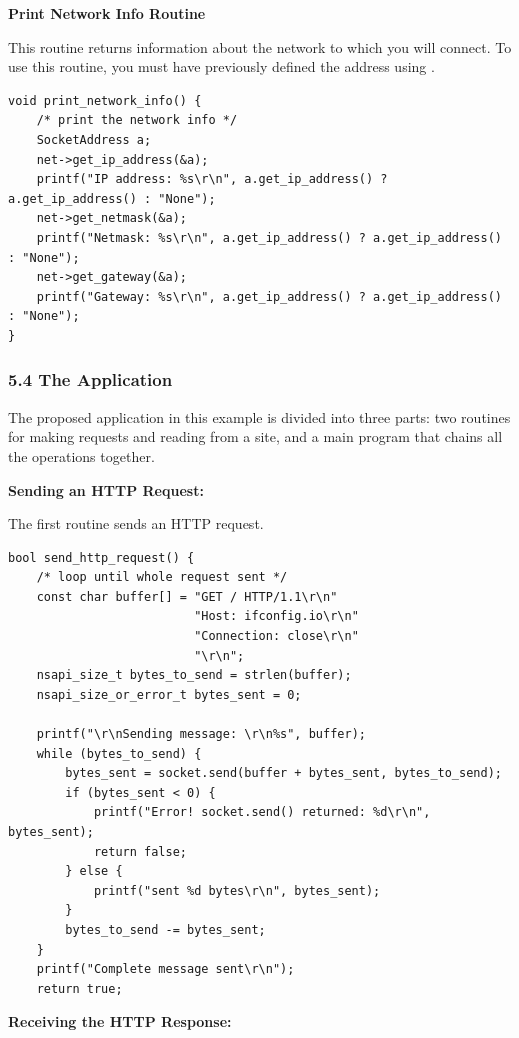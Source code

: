 \documentclass[10pt,a4paper,onecolumn]{article}
\let\textttOrig=\texttt
\def\texttt#1{\expandafter\textttOrig{\seqsplit{#1}}}
\begin{document}
\textbf{Print Network Info Routine}

This routine returns information about the network to which you will connect. To use this routine, you must have previously defined the address using \texttt{resolve\_hostname}.

\begin{lstlisting}[style=CStyle]
void print_network_info() {
    /* print the network info */
    SocketAddress a;
    net->get_ip_address(&a);
    printf("IP address: %s\r\n", a.get_ip_address() ? a.get_ip_address() : "None");
    net->get_netmask(&a);
    printf("Netmask: %s\r\n", a.get_ip_address() ? a.get_ip_address() : "None");
    net->get_gateway(&a);
    printf("Gateway: %s\r\n", a.get_ip_address() ? a.get_ip_address() : "None");
}
\end{lstlisting}

\hypertarget{the-application}{%
\subsubsection{5.4 The Application}\label{the-application}}

The proposed application in this example is divided into three parts:
two routines for making requests and reading from a site, and a main
program that chains all the operations together.

\textbf{Sending an HTTP Request:}

The first routine sends an HTTP request.

\begin{lstlisting}[style=CStyle]
  bool send_http_request() {
    /* loop until whole request sent */
    const char buffer[] = "GET / HTTP/1.1\r\n"
                          "Host: ifconfig.io\r\n"
                          "Connection: close\r\n"
                          "\r\n";
    nsapi_size_t bytes_to_send = strlen(buffer);
    nsapi_size_or_error_t bytes_sent = 0;

    printf("\r\nSending message: \r\n%s", buffer);
    while (bytes_to_send) {
        bytes_sent = socket.send(buffer + bytes_sent, bytes_to_send);
        if (bytes_sent < 0) {
            printf("Error! socket.send() returned: %d\r\n", bytes_sent);
            return false;
        } else {
            printf("sent %d bytes\r\n", bytes_sent);
        }
        bytes_to_send -= bytes_sent;
    }
    printf("Complete message sent\r\n");
    return true;
\end{lstlisting}

\textbf{Receiving the HTTP Response:}
\end{document}
